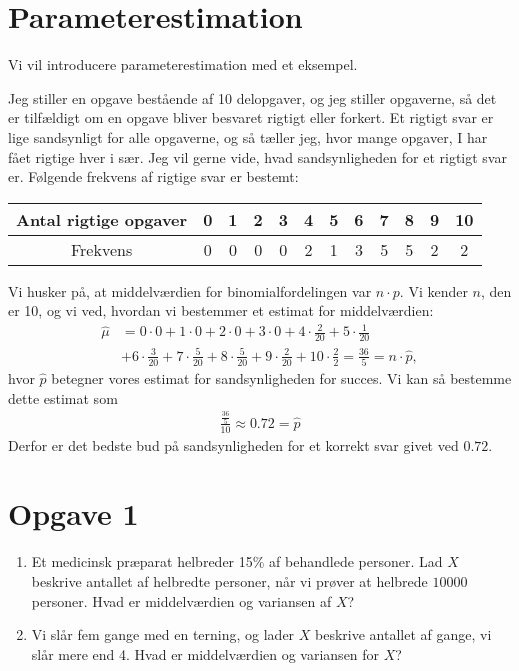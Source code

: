 \section*{Parameterestimation}
Vi vil introducere parameterestimation med et eksempel.
\begin{exa}
Jeg stiller en opgave bestående af 10 delopgaver, og jeg stiller opgaverne, så det er tilfældigt om en opgave bliver besvaret rigtigt eller forkert. Et rigtigt svar er lige sandsynligt for alle opgaverne, og så tæller jeg, hvor mange opgaver, I har fået rigtige hver i sær. Jeg vil gerne vide, hvad sandsynligheden for et rigtigt svar er.
Følgende frekvens af rigtige svar er bestemt:
\begin{center}
\begin{tabular}{c|c|c|c|c|c|c|c|c|c|c|c}
Antal rigtige opgaver&0 & 1 & 2 & 3 & 4 & 5 & 6 & 7 & 8 & 9 & 10\\
\hline 
Frekvens&0 & 0 & 0 & 0 & 2 & 1 & 3 & 5 & 5 & 2 & 2 
\end{tabular}
\end{center}
Vi husker på, at middelværdien for binomialfordelingen var $n\cdot p$. Vi kender $n$, den er 10, og vi ved, hvordan vi bestemmer et estimat for middelværdien:
\begin{align*}
\hat{\mu} &= 0 \cdot 0 + 1 \cdot 0 + 2 \cdot 0 + 3 \cdot 0 + 4 \cdot \frac{2}{20}+ 5 \cdot \frac{1}{20} \\
          &+ 6 \cdot \frac{3}{20} + 7 \cdot \frac{5}{20} + 8 \cdot \frac{5}{20} + 9 \cdot \frac{2}{20}+ 10\cdot \frac{2}{2} = \frac{36}{5} = n\cdot \hat{p},
\end{align*}
hvor $\hat{p}$ betegner vores estimat for sandsynligheden for succes. Vi kan så bestemme dette estimat som
\begin{align*}
\frac{\frac{36}{5}}{10} \approx 0.72 = \hat{p}
\end{align*}
Derfor er det bedste bud på sandsynligheden for et korrekt svar givet ved $0.72$.
\end{exa}

\section*{Opgave 1}
\begin{enumerate}[label=\roman*)]
\item Et medicinsk præparat helbreder 15$\%$ af behandlede personer. Lad $X$ beskrive antallet af helbredte personer, når vi prøver at helbrede $10000$ personer. Hvad er middelværdien og variansen af $X$?
\item Vi slår fem gange med en terning, og lader $X$ beskrive antallet af gange, vi slår mere end 4. Hvad er middelværdien og variansen for $X$?
\end{enumerate}

